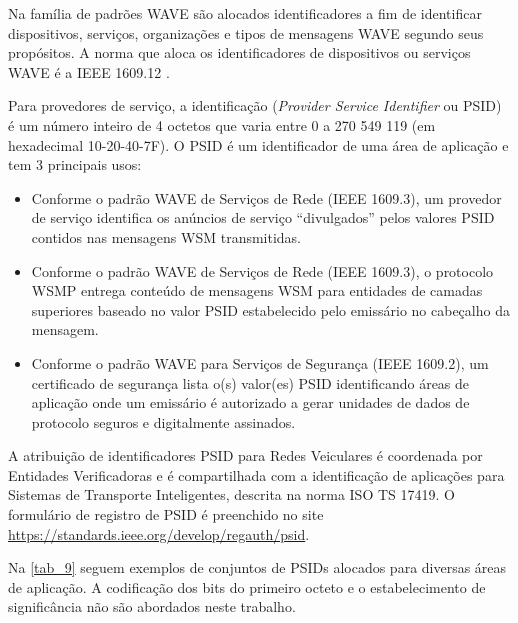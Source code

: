 \documentclass[
12pt,				%
openright,			%
oneside,			%
a4paper,			%
brazil,				%
]{abntex2}
\begin{document}
{\begin{anexosenv}
		\par Na família de padrões WAVE são alocados identificadores a fim de identificar dispositivos, serviços, organizações e tipos de mensagens WAVE segundo seus propósitos. A norma que aloca os identificadores de dispositivos ou serviços WAVE é a IEEE 1609.12 .
		
		\par Para provedores de serviço, a identificação (\textit{Provider Service Identifier} ou PSID) é um número inteiro de 4 octetos que varia entre 0 a 270 549 119 (em hexadecimal 10-20-40-7F). O PSID é um identificador de uma área de aplicação e tem 3 principais usos:
		
		\begin{itemize}
			
			\item Conforme o padrão WAVE de Serviços de Rede (IEEE 1609.3), um provedor de serviço identifica os anúncios de serviço “divulgados” pelos valores PSID contidos nas mensagens WSM transmitidas.
			\item Conforme o padrão WAVE de Serviços de Rede (IEEE 1609.3), o protocolo WSMP entrega conteúdo de mensagens WSM para entidades de camadas superiores baseado no valor PSID estabelecido pelo emissário no cabeçalho da mensagem.
			\item Conforme o padrão WAVE para Serviços de Segurança (IEEE 1609.2), um certificado de segurança lista o(s) valor(es) PSID identificando áreas de aplicação onde um emissário é autorizado a gerar unidades de dados de protocolo seguros e digitalmente assinados.
			
		\end{itemize}	
		
		\par A atribuição de identificadores PSID para Redes Veiculares é coordenada por Entidades Verificadoras e é compartilhada com a identificação de aplicações para Sistemas de Transporte Inteligentes, descrita na norma ISO TS 17419. O formulário de registro de PSID é preenchido no site \href{https://standards.ieee.org/develop/regauth/psid}{https://standards.ieee.org/develop/regauth/psid}.
		
		\par Na \autoref{tab_9} seguem exemplos de conjuntos de PSIDs alocados para diversas áreas de aplicação. A codificação dos bits do primeiro octeto e o estabelecimento de significância não são abordados neste trabalho.
		
		

\end{anexosenv}}
\end{document}
